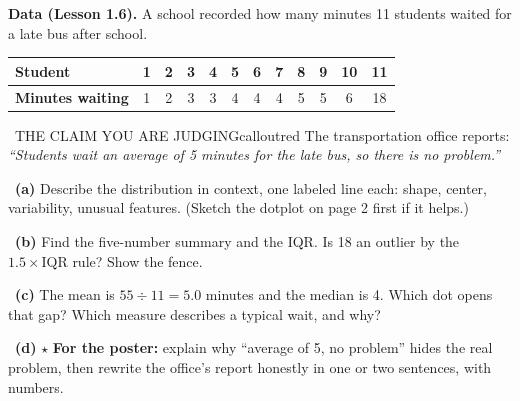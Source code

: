 
\textbf{Data (Lesson 1.6).} A school recorded how many minutes 11 students waited for a late bus after school.

\begin{center}
\begin{tabular}{|l|c|c|c|c|c|c|c|c|c|c|c|}\hline
\textbf{Student} & 1 & 2 & 3 & 4 & 5 & 6 & 7 & 8 & 9 & 10 & 11 \\ \hline
\textbf{Minutes waiting} & 1 & 2 & 3 & 3 & 4 & 4 & 4 & 5 & 5 & 6 & 18 \\ \hline
\end{tabular}
\end{center}

\begin{callout}{\IconWarn\ THE CLAIM YOU ARE JUDGING}{calloutred}
The transportation office reports: \emph{``Students wait an average of 5 minutes for the late bus, so there is no problem.''}
\end{callout}

~\textbf{(a)} Describe the distribution in context, one labeled line each: shape, center, variability, unusual features. (Sketch the dotplot on page 2 first if it helps.)
\workspace{0.95in}

~\textbf{(b)} Find the five-number summary and the IQR. Is 18 an outlier by the $1.5 \times \text{IQR}$ rule? Show the fence.
\workspace{0.8in}

~\textbf{(c)} The mean is $55 \div 11 = 5.0$ minutes and the median is 4. Which dot opens that gap? Which measure describes a typical wait, and why?
\workspace{0.75in}

~\textbf{(d)} $\star$ \textbf{For the poster:} explain why ``average of 5, no problem'' hides the real problem, then rewrite the office's report honestly in one or two sentences, with numbers.
\workspace{1.3in}

